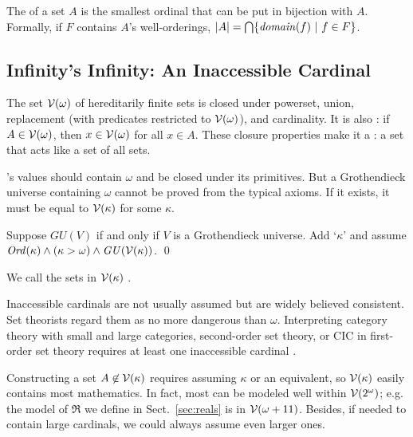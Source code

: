 The  of a set $A$ is the smallest ordinal that can be put in bijection with $A$. Formally, if $F$ contains $A$'s well-orderings, $|A| = \textstyle\bigcap \lbrace {\mathit{domain}(f)} \ \lvert\ {f \in F} \rbrace$.


\subsection{Infinity's Infinity: An Inaccessible Cardinal}

The set $\mathcal{V}(\omega)$ of hereditarily finite sets is closed under powerset, union, replacement (with predicates restricted to $\mathcal{V}(\omega)$), and cardinality. It is also : if $A \in \mathcal{V}(\omega)$, then $x \in \mathcal{V}(\omega)$ for all $x \in A$. These closure properties make it a : a set that acts like a set of all sets.

\targetlang's values should contain $\omega$ and be closed under its primitives. But a Grothendieck universe containing $\omega$ cannot be proved from the typical axioms. If it exists, it must be equal to $\mathcal{V}(\kappa)$ for some  $\kappa$.
\begin{axiom}
Suppose $\mathit{GU}(V)$ if and only if $V$ is a Grothendieck universe. Add `$\kappa$' and assume $\mathit{Ord}(\kappa) \wedge (\kappa > \omega) \wedge \mathit{GU}(\mathcal{V}(\kappa))$.
\qed
\end{axiom}
We call the sets in $\mathcal{V}(\kappa)$ .

Inaccessible cardinals are not usually assumed but are widely believed consistent. Set theorists regard them as no more dangerous than $\omega$. Interpreting category theory with small and large categories, second-order set theory, or CIC in first-order set theory requires at least one inaccessible cardinal \cite{cit:uzquiano-1999-models-zf2,cit:barras-2010-sets-coq,cit:werner-1997-sets-types}.

Constructing a set $A \not\in \mathcal{V}(\kappa)$ requires assuming $\kappa$ or an equivalent, so $\mathcal{V}(\kappa)$ easily contains most mathematics. In fact, most can be modeled well within $\mathcal{V}(2^\omega)$; e.g. the model of $\Re$ we define in Sect.~\ref{sec:reals} is in $\mathcal{V}(\omega + 11)$. Besides, if \targetlang needed to contain large cardinals, we could always assume even larger ones.

\begin{comment}
rank(A x B) = max(rank(A),rank(B)) + 2
rank(A -> B) = max(rank(A),rank(B)) + 3
rank(quotient A) = rank(A) + 1

rank(Z) = omega + 2 + 1
rank(Q) = rank(Z) + 2 + 1
rank(R) = rank(Q) + 3 + 1
\end{comment}

